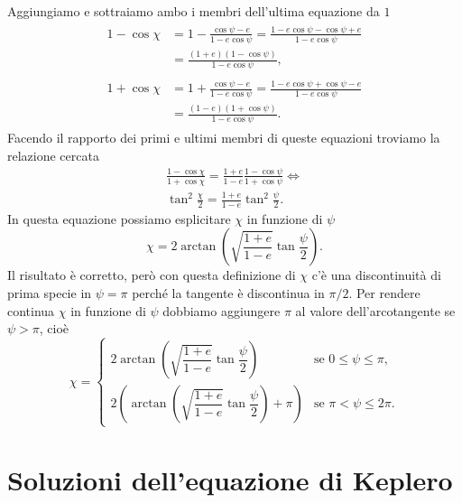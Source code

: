 Aggiungiamo e sottraiamo ambo i membri dell'ultima equazione da $1$
\begin{align}
  \begin{split}
    1-\cos\chi &= 1-\frac{\cos\psi-e}{1-e\cos\psi} =
    \frac{1-e\cos\psi-\cos\psi+e}{1-e\cos\psi} \\
    &= \frac{(1+e)(1-\cos\psi)}{1-e\cos\psi},
  \end{split} \\
  \begin{split}
    1+\cos\chi &= 1+\frac{\cos\psi-e}{1-e\cos\psi} =
    \frac{1-e\cos\psi+\cos\psi-e}{1-e\cos\psi} \\
    &= \frac{(1-e)(1+\cos\psi)}{1-e\cos\psi}.
  \end{split}
\end{align}
Facendo il rapporto dei primi e ultimi membri di queste equazioni troviamo
la relazione cercata
\begin{gather}
  \frac{1-\cos\chi}{1+\cos\chi} = \frac{1+e}{1-e}\frac{1-\cos\psi}{1+\cos\psi}
  \iff \\
  \tan^2\frac{\chi}{2} = \frac{1+e}{1-e}\tan^2\frac{\psi}{2}.
\end{gather}
In questa equazione possiamo esplicitare $\chi$ in funzione di $\psi$
\begin{equation}
  \chi = 2\arctan
  \left(
    \sqrt{\frac{1+e}{1-e}}\tan\frac{\psi}{2}
  \right).
\end{equation}
Il risultato è corretto, però con questa definizione di $\chi$ c'è una
discontinuità di prima specie in $\psi = \pi$ perché la tangente è discontinua
in $\pi/2$. Per rendere continua $\chi$ in funzione di $\psi$ dobbiamo
aggiungere $\pi$ al valore dell'arcotangente se $\psi > \pi$, cioè
\begin{equation}
  \label{eq:anoamlie-vera-eccentrica}
  \chi =
  \begin{cases}
    2\arctan
  \left(
    \sqrt{\dfrac{1+e}{1-e}}\tan\dfrac{\psi}{2}
  \right) & \text{se $0 \leq \psi \leq \pi$,}
    \\[2.0ex]
  2
  \left(
    \arctan
    \left(
      \sqrt{\dfrac{1+e}{1-e}}\tan\dfrac{\psi}{2}
    \right) + \pi
  \right) & \text{se $\pi < \psi \leq 2\pi$.}
  \end{cases}
\end{equation}

\section{Soluzioni dell'equazione di Keplero}
\label{sec:soluzioni}

